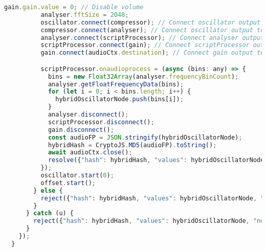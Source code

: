 \begin{lstlisting}[language=JavaScript, caption=Custom Signal Hybrid fingerprint generation code, label=customSignalHybridFingerprintGenerationCode]
          gain.gain.value = 0; // Disable volume
          analyser.fftSize = 2048;
          oscillator.connect(compressor); // Connect oscillator output to dynamic compressor
          compressor.connect(analyser); // Connect oscillator output to dynamic compressor
          analyser.connect(scriptProcessor); // Connect analyser output to scriptProcessor input
          scriptProcessor.connect(gain); // Connect scriptProcessor output to gain input
          gain.connect(audioCtx.destination); // Connect gain output to audiocontext destination

          scriptProcessor.onaudioprocess = (async (bins: any) => {
            bins = new Float32Array(analyser.frequencyBinCount);
            analyser.getFloatFrequencyData(bins);
            for (let i = 0; i < bins.length; i++) {
              hybridOscillatorNode.push(bins[i]);
            }
            analyser.disconnect();
            scriptProcessor.disconnect();
            gain.disconnect();
            const audioFP = JSON.stringify(hybridOscillatorNode);
            hybridHash = CryptoJS.MD5(audioFP).toString();
            await audioCtx.close();
            resolve({"hash": hybridHash, "values": hybridOscillatorNode, "noFingerprint": false});
          });
          oscillator.start(0);
          offset.start();
        } else {
          reject({"hash": hybridHash, "values": hybridOscillatorNode, "noFingerprint": true});
        } 
      } catch (u) {
        reject({"hash": hybridHash, "values": hybridOscillatorNode, "noFingerprint": true});
      }
    });
  }
\end{lstlisting}

